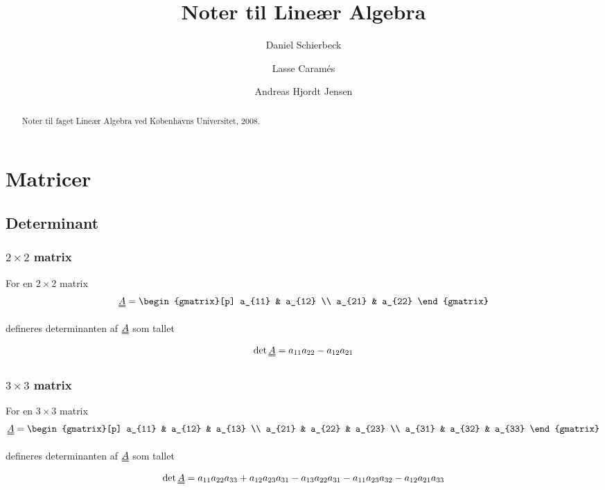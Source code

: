 \documentclass[a4paper]{article}
\title{Noter til Lineær Algebra}
\author{Daniel Schierbeck \and Lasse Caramés \and Andreas Hjordt Jensen}
\newcommand{\mtx}[1]{\uuline{#1}}
\begin{document}
\maketitle

\begin{abstract}
Noter til faget Lineær Algebra ved Københavns Universitet, 2008.
\end{abstract}

\section{Matricer}

\subsection{Determinant}

\subsubsection{$2 \times 2$ matrix}

For en $2 \times 2$ matrix
$$
\mtx{A} =
\begin{gmatrix}[p]
    a_{11} & a_{12} \\
    a_{21} & a_{22}
\end{gmatrix}
$$

defineres determinanten af $\mtx{A}$ som tallet
$$
\det{\mtx{A}} = a_{11}a_{22} - a_{12}a_{21}
$$


\subsubsection{$3 \times 3$ matrix}

For en $3 \times 3$ matrix
$$
\mtx{A} =
\begin{gmatrix}[p]
    a_{11} & a_{12} & a_{13} \\
    a_{21} & a_{22} & a_{23} \\
    a_{31} & a_{32} & a_{33}
\end{gmatrix}
$$

defineres determinanten af $\mtx{A}$ som tallet
$$
\det{\mtx{A}} = a_{11}a_{22}a_{33} + a_{12}a_{23}a_{31} - a_{13}a_{22}a_{31} - a_{11}a_{23}a_{32} - a_{12}a_{21}a_{33}
$$
\end{document}
